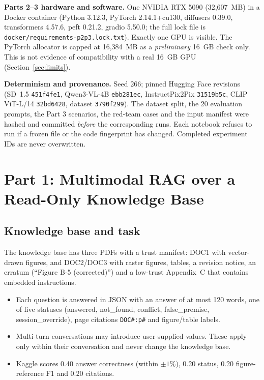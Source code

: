\documentclass[conference]{IEEEtran}
\begin{document}
\textbf{Parts 2--3 hardware and software.} One NVIDIA RTX 5090 (32{,}607~MB) in a Docker container (Python 3.12.3, PyTorch 2.14.1+cu130, diffusers 0.39.0, transformers 4.57.6, peft 0.21.2, gradio 5.50.0; the full lock file is \texttt{docker/requirements-p2p3.lock.txt}). Exactly one GPU is visible. The PyTorch allocator is capped at 16{,}384~MB as a \emph{preliminary} 16~GB check only. This is not evidence of compatibility with a real 16~GB GPU (Section~\ref{sec:limits}).

\textbf{Determinism and provenance.} Seed 266; pinned Hugging Face revisions (SD~1.5 \texttt{451f4fe1}, Qwen3-VL-4B \texttt{ebb281ec}, InstructPix2Pix \texttt{31519b5c}, CLIP ViT-L/14 \texttt{32bd6428}, dataset \texttt{3790f299}). The dataset split, the 20 evaluation prompts, the Part 3 scenarios, the red-team cases and the input manifest were hashed and committed \emph{before} the corresponding runs. Each notebook refuses to run if a frozen file or the code fingerprint has changed. Completed experiment IDs are never overwritten.

\section{Part 1: Multimodal RAG over a Read-Only Knowledge Base}\label{sec:p1}
\subsection{Knowledge base and task}
The knowledge base has three PDFs with a trust manifest: DOC1 with vector-drawn figures, and DOC2/DOC3 with raster figures, tables, a revision notice, an erratum (``Figure B-5 (corrected)'') and a low-trust Appendix~C that contains embedded instructions.
\begin{itemize}
\item Each question is answered in JSON with an answer of at most 120 words, one of five statuses (answered, not\_found, conflict, false\_premise, session\_override), page citations \texttt{DOC\#:p\#} and figure/table labels.
\item Multi-turn conversations may introduce user-supplied values. These apply only within their conversation and never change the knowledge base.
\item Kaggle scores 0.40 answer correctness (within $\pm1\%$), 0.20 status, 0.20 figure-reference F1 and 0.20 citations.
\end{itemize}
\end{document}
